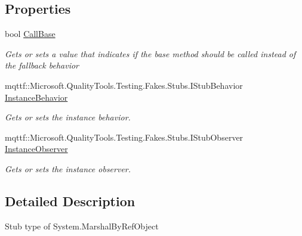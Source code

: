 \subsection*{Properties}
\begin{DoxyCompactItemize}
\item 
bool \hyperlink{class_system_1_1_fakes_1_1_stub_marshal_by_ref_object_a6e98894592221f4ed1947e0594779739}{Call\-Base}
\begin{DoxyCompactList}\small\item\em Gets or sets a value that indicates if the base method should be called instead of the fallback behavior\end{DoxyCompactList}\item 
mqttf\-::\-Microsoft.\-Quality\-Tools.\-Testing.\-Fakes.\-Stubs.\-I\-Stub\-Behavior \hyperlink{class_system_1_1_fakes_1_1_stub_marshal_by_ref_object_aff431b06244392e0bc58836b0e8e0756}{Instance\-Behavior}
\begin{DoxyCompactList}\small\item\em Gets or sets the instance behavior.\end{DoxyCompactList}\item 
mqttf\-::\-Microsoft.\-Quality\-Tools.\-Testing.\-Fakes.\-Stubs.\-I\-Stub\-Observer \hyperlink{class_system_1_1_fakes_1_1_stub_marshal_by_ref_object_aad21c20c2e3c26ed3b6ced604bc31399}{Instance\-Observer}
\begin{DoxyCompactList}\small\item\em Gets or sets the instance observer.\end{DoxyCompactList}\end{DoxyCompactItemize}


\subsection{Detailed Description}
Stub type of System.\-Marshal\-By\-Ref\-Object



